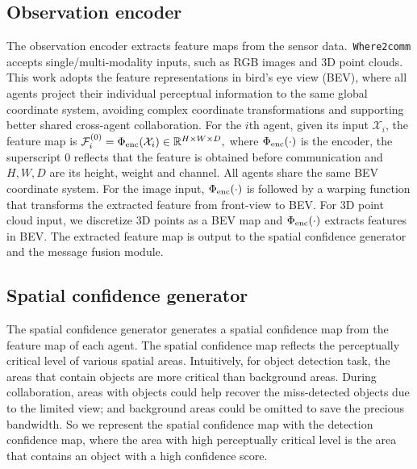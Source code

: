 \documentclass{article}
\begin{document}
\subsection{Observation encoder}
\label{sec:Encoder}
\vspace{-2mm}
The observation encoder extracts feature maps from the sensor data.~\texttt{Where2comm} accepts single/multi-modality inputs, such as RGB images and 3D point clouds. This work adopts the feature representations in bird's eye view (BEV), where all agents project their individual perceptual information to the same global coordinate system, avoiding complex coordinate transformations and supporting better shared cross-agent collaboration. For the $i$th agent, given its input $\mathcal{X}_i$, the feature map is 
$ 
\mathcal{F}_i^{(0)} = \Phi_{\rm enc}(\mathcal{X}_i) \in \mathbb{R}^{H \times W \times D},$
where $\Phi_{\rm enc}(\cdot)$ is the encoder, the superscript $0$ reflects that the feature is obtained before communication and $H,W,D$ are its height, weight and channel. All agents share the same BEV coordinate system. For the image input, $\Phi_{\rm enc}(\cdot)$ is followed by a warping function that transforms the extracted feature from front-view to BEV. For 3D point cloud input, we discretize 3D points as a BEV map and $\Phi_{\rm enc}(\cdot)$ extracts features in BEV. The extracted feature map is output to the spatial confidence generator and the message fusion module.


\vspace{-2mm}
\subsection{Spatial confidence generator}
\label{sec:Generator}
\vspace{-2mm}
The spatial confidence generator generates a spatial confidence map from the feature map of each agent. The spatial confidence map reflects the perceptually critical level of various spatial areas. Intuitively, for object detection task, the areas that contain objects are more critical than background areas. During collaboration, areas with objects could help recover the miss-detected objects due to the limited view; and background areas could be omitted to save the precious bandwidth. So we represent the spatial confidence map with the detection confidence map, where the area with high perceptually critical level is the area that contains an object with a high confidence score.
\end{document}
